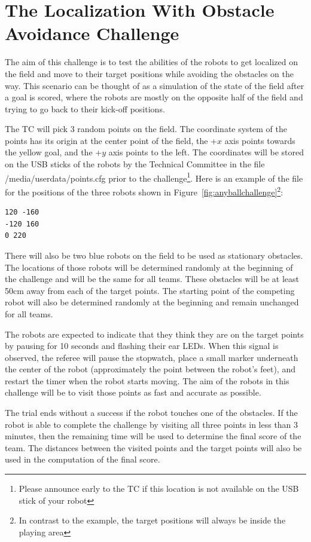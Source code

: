 \documentclass{article}
\begin{document}
\section{The Localization With Obstacle Avoidance Challenge}
\label{sec:localization}

The aim of this challenge is to test the abilities of the robots to get localized on the field and move to their target positions while avoiding the obstacles on the way. This scenario can be thought of as a simulation of the state of the field after a goal is scored, where the robots are mostly on the opposite half of the field and trying to go back to their kick-off positions. 

The TC will pick 3 random points on the field. The coordinate system of the points has its origin at the center point of the field, the +$x$ axis points towards the yellow goal, and the +$y$ axis points to the left. The coordinates will be stored on the USB sticks of the robots by the Technical Committee in the file /media/userdata/points.cfg prior to the challenge\footnote{Please announce early to the TC if this location is not available on the USB stick of your robot}. Here is an example of the file for the positions of the three robots shown in Figure~\ref{fig:anyballchallenge}\footnote{In contrast to the example, the target positions will always be inside the playing area}:
%
{\small\begin{verbatim}
120 -160
-120 160
0 220
\end{verbatim}}
%
There will also be two blue robots on the field to be used as stationary obstacles. The locations of those robots will be determined randomly at the beginning of the challenge and will be the same for all teams. These obstacles will be at least 50cm away from each of the target points. The starting point of the competing robot will also be determined randomly at the beginning and remain unchanged for all teams. 

The robots are expected to indicate that they think they are on the target points by pausing for 10 seconds and flashing their ear LEDs. When this signal is observed, the referee will pause the stopwatch, place a small marker underneath the center of the robot (approximately the point between the robot's feet), and restart the timer when the robot starts moving. The aim of the robots in this challenge will be to visit those points as fast and accurate as possible.

The trial ends without a success if the robot touches one of the obstacles. If the robot is able to complete the challenge by visiting all three points in less than 3 minutes, then the remaining time will be used to determine the final score of the team. The distances between the visited points and the target points will also be used in the computation of the final score.
\end{document}
